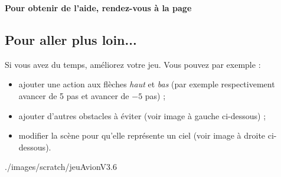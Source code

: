 \textbf{Pour obtenir de l'aide, rendez-vous à la page \pageref{correction_scratch3}}

\newpage

\subsection{Pour aller plus loin...}  

Si vous avez du temps, améliorez votre jeu. Vous pouvez par exemple :

\begin{itemize}
\item ajouter une action aux flèches \emph{haut} et \emph{bas} (par exemple respectivement avancer de 5 pas et avancer de $-5$ pas) ;  
\item ajouter d'autres obstacles à éviter (voir image à gauche ci-dessous) ;
\item modifier la scène pour qu'elle représente un ciel (voir image à droite ci-dessous).
\end{itemize}

%
              {./images/scratch/jeuAvionV3}{.6\textwidth}
